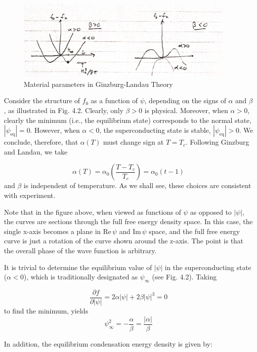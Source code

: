 \documentclass{article}
\begin{document}
\begin{figure}
    \begin{center}
        \includegraphics[width=0.95\textwidth]{figures/9.png}
    \end{center}
    \caption{Material parameters in Ginzburg-Landau Theory}\label{fig:}
\end{figure}

Consider the structure of $f_0$ as a function of $\psi$, depending on the signs of $\alpha$ and $\beta$, as illustrated in Fig. 4.2. Clearly, only $\beta > 0$ is physical. Moreover, when $\alpha > 0$, clearly the minimum (i.e., the equilibrium state) corresponds to the normal state, $|\psi_{\text{eq}}| = 0$. However, when $\alpha < 0$, the superconducting state is stable, $|\psi_{\text{eq}}| > 0$. We conclude, therefore, that $\alpha(T)$ must change sign at $T = T_c$. Following Ginzburg and Landau, we take

\[
\alpha(T) = \alpha_0 \left( \frac{T - T_c}{T_c} \right) = \alpha_0 (t - 1) \tag{31}
\]
and $\beta$ is independent of temperature. As we shall see, these choices are consistent with experiment.


Note that in the figure above, when viewed as functions of $\psi$ as opposed to $|\psi|$, the curves are sections through the full free energy density space. In this case, the single x-axis becomes a plane in $\text{Re} \, \psi$ and $\text{Im} \, \psi$ space, and the full free energy curve is just a rotation of the curve shown around the z-axis. The point is that the overall phase of the wave function is arbitrary.

It is trivial to determine the equilibrium value of $|\psi|$ in the superconducting state ($\alpha < 0$), which is traditionally designated as $\psi_\infty$ (see Fig. 4.2). Taking

\[
\frac{\partial f}{\partial |\psi|} = 2 \alpha |\psi| + 2 \beta |\psi|^3 = 0 \tag{32}
\]
to find the minimum, yields
\[
\psi_\infty^2 = -\frac{\alpha}{\beta} = \frac{|\alpha|}{\beta} \tag{33}
\]

In addition, the equilibrium condensation energy density is given by:
\end{document}
